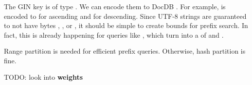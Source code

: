 The GIN key is of type .  We can encode them to DocDB
.  For example,  is encoded to
 for ascending and 
for descending.  Since UTF-8 strings are guaranteed to not have bytes
, , or , it should be
simple to create bounds for prefix search.  In fact, this is already happening
for queries like , which turn into a
 of  and .

Range partition is needed for efficient prefix queries.  Otherwise, hash
partition is fine.

TODO: look into  \textbf{weights}

